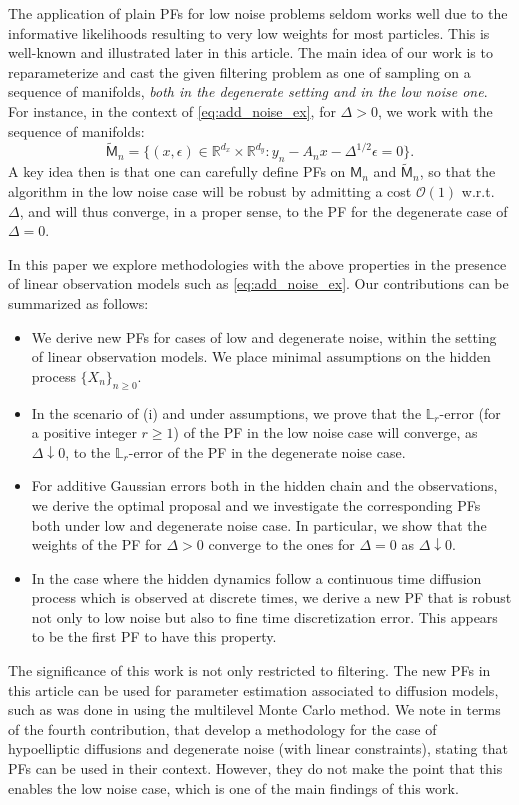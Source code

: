 \documentclass[english,13pt]{article}
\numberwithin{equation}{section}
\begin{document}
The application of {plain} PFs for low noise problems seldom works well due to the informative likelihoods resulting to very low weights for most particles. This is well-known and illustrated later in this article. The main idea of our work is to {reparameterize} and cast the given filtering problem as one of sampling on a sequence of manifolds, \emph{both in the degenerate setting and in the low noise one}.  
{For instance},  in the context of \eqref{eq:add_noise_ex}, for $\Delta > 0$, we work with the sequence of manifolds: 
%
\begin{equation*}
\widetilde{\mathsf{M}}_n=\{(x,\epsilon)\in\mathbb{R}^{d_x}\times\mathbb{R}^{d_y}:y_n-A_nx-\Delta^{1/2}\epsilon=0\}.
\end{equation*} 
%
A key idea then is that one can carefully define PFs on $\mathsf{M}_n$ and $\widetilde{\mathsf{M}}_n$, so that the algorithm in the low noise case will be robust by admitting a cost $\mathcal{O}(1)$  w.r.t.~$\Delta$, and will thus converge, in a proper sense, to the PF for the degenerate case of $\Delta=0$. 

 In this paper we explore methodologies with the above properties in the presence of linear observation models such as 
\eqref{eq:add_noise_ex}. Our contributions can be summarized as follows:
%
\begin{itemize}
\item[(i)]We derive new PFs for cases of low and degenerate noise, within the setting of linear observation models.  We place minimal assumptions on the hidden process $\{X_n\}_{n\geq 0}$.
\item[(ii)]In the scenario of (i) and under assumptions, we prove that the $\mathbb{L}_r$-error (for a positive integer $r\ge 1$) of the PF in the low noise case will converge, as $\Delta\downarrow 0$, to the $\mathbb{L}_r$-error of the PF in the degenerate noise case.
\item[(iii)] For additive Gaussian errors both in the hidden chain and the observations, we derive the optimal proposal and we investigate 
the corresponding PFs both under low and degenerate noise case. In particular, we show that the weights of the PF for $\Delta>0$ converge  to the ones for $\Delta=0$ as $\Delta\downarrow 0$.
\item[(iv)]In the case where the hidden dynamics follow a {continuous time} diffusion process
which is observed at discrete times,  
we derive a new PF that is robust not only to low noise but also to fine time discretization error. This appears to be the first PF to have this property.
\end{itemize}
%
The significance of this work is not only restricted to filtering.  The new PFs in this article can be used for parameter estimation
associated to diffusion models,  such as was done in \cite{diff_bridge,non_synch} using the multilevel Monte Carlo method.  We note in terms of the fourth contribution,  that \cite{bierkens} develop a methodology for the case of hypoelliptic diffusions and degenerate noise (with linear constraints),  stating that PFs can be used in their context.  However, they do not make the point that this enables the low noise case,  which is one of the main findings of this work.
\end{document}
